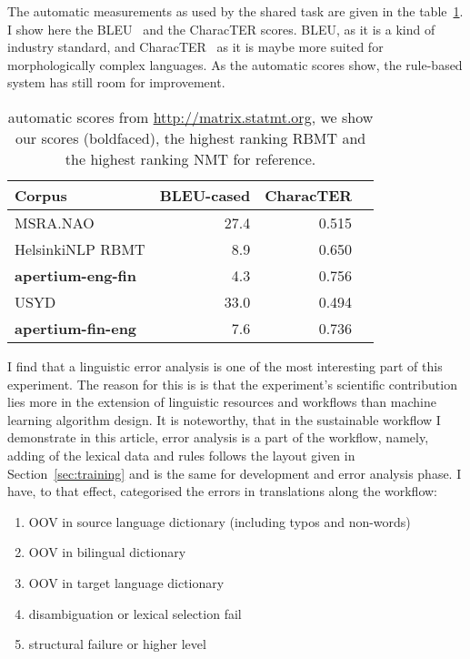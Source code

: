 \documentclass[11pt,a4paper]{article}
\begin{document}
The automatic measurements as used by the shared task are given in the
table~\ref{table:bleu}. I show here the BLEU~\cite{papineni2002bleu} and the CharacTER scores.
BLEU, as it is a kind of industry standard, and CharacTER~\cite{wang2016character} as it is maybe more suited for
morphologically complex languages. As the automatic scores show, the rule-based
system has still room for improvement.

\begin{table}
\begin{center}
    \begin{tabular}{lrrr}
        \toprule
        \bf Corpus & BLEU-cased & CharacTER \\
        \midrule
        MSRA.NAO & 27.4 & 0.515 \\
        HelsinkiNLP RBMT & 8.9 & 0.650 \\
        \bf apertium-eng-fin & 4.3 & 0.756  \\
        \midrule
        USYD & 33.0 & 0.494 \\
        \bf apertium-fin-eng & 7.6 & 0.736  \\
        \bottomrule
    \end{tabular}
    \caption{automatic scores from \url{http://matrix.statmt.org}, we show our scores (boldfaced), the highest
    ranking RBMT and the highest ranking NMT for reference.\label{table:bleu}}
\end{center}
\end{table}



I find that a linguistic error analysis is one of the most interesting part of
this experiment. The reason for this is is that the experiment's scientific
contribution lies more in the extension of linguistic resources and workflows
than machine learning algorithm design. It is noteworthy, that in
the sustainable workflow I demonstrate in this article, error analysis is a
part of the workflow, namely, adding of the lexical data and rules follows the
layout given in Section~\ref{sec:training} and is the same for development and
error analysis phase. I have, to that effect, categorised the errors in
translations along the workflow:

\begin{enumerate}
    \item OOV in source language dictionary (including typos and non-words)
    \item OOV in bilingual dictionary
    \item OOV in target language dictionary
    \item disambiguation or lexical selection fail
    \item structural failure or higher level
\end{enumerate}
\end{document}
